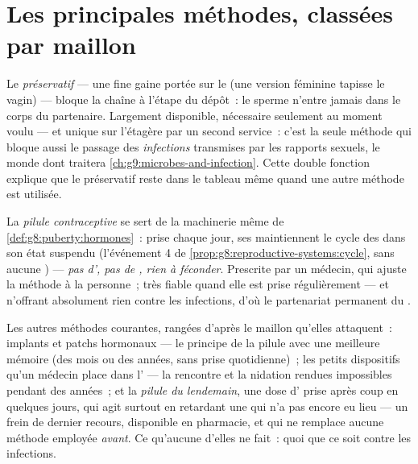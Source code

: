 \section{Les principales méthodes, classées par maillon}

\begin{definition}\label{def:g8:contraception:condom}
Le \emph{préservatif} --- une fine gaine portée
sur le  (une version féminine tapisse le vagin) --- bloque la
chaîne à l'étape du dépôt~: le sperme n'entre jamais dans le corps
du partenaire. Largement disponible, nécessaire seulement au moment
voulu --- et unique sur l'étagère par un second service~: c'est la
seule méthode qui bloque aussi le passage des \emph{infections}
transmises par les rapports sexuels, le monde dont traitera
\cref{ch:g9:microbes-and-infection}. Cette double fonction explique
que le préservatif reste dans le tableau même quand une autre
méthode est utilisée.
\end{definition}

\begin{definition}\label{def:g8:contraception:pill}
La \emph{pilule contraceptive} se sert
de la machinerie même de \cref{def:g8:puberty:hormones}~: prise
chaque jour, ses  maintiennent le cycle des  dans son
état suspendu (l'événement 4 de
\cref{prop:g8:reproductive-systems:cycle}, sans aucune )
--- \emph{pas d', pas de , rien à féconder}.
Prescrite par un médecin, qui ajuste la méthode à la personne~; très
fiable quand elle est prise régulièrement --- et n'offrant
absolument rien contre les infections, d'où le partenariat permanent
du .
\end{definition}

\begin{example}\label{ex:g8:contraception:shelf}
Les autres méthodes courantes, rangées d'après le maillon qu'elles
attaquent~: implants et patchs hormonaux --- le principe de la
pilule avec une meilleure mémoire (des mois ou des années, sans
prise quotidienne)~; les petits dispositifs qu'un médecin place dans
l' --- la rencontre et la nidation rendues impossibles pendant
des années~; et la \emph{pilule du lendemain}, une dose d'
prise après coup en quelques jours, qui agit surtout en retardant une
 qui n'a pas encore eu lieu --- un frein de dernier
recours, disponible en pharmacie, et qui ne remplace aucune méthode
employée \emph{avant}. Ce qu'aucune d'elles ne fait~: quoi que ce
soit contre les infections.
\end{example}

